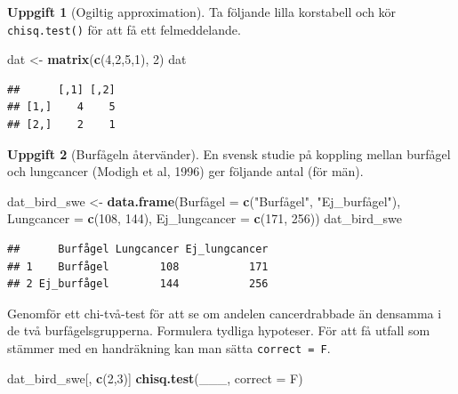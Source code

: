 \documentclass[
]{book}
\newenvironment{Shaded}{\begin{snugshade}}{\end{snugshade}}
\newcommand{\AttributeTok}[1]{\textcolor[rgb]{0.13,0.29,0.53}{#1}}
\newcommand{\DecValTok}[1]{\textcolor[rgb]{0.00,0.00,0.81}{#1}}
\newcommand{\FunctionTok}[1]{\textcolor[rgb]{0.13,0.29,0.53}{\textbf{#1}}}
\newcommand{\NormalTok}[1]{#1}
\newcommand{\OtherTok}[1]{\textcolor[rgb]{0.56,0.35,0.01}{#1}}
\newcommand{\StringTok}[1]{\textcolor[rgb]{0.31,0.60,0.02}{#1}}
\theoremstyle{definition}
\theoremstyle{definition}
\theoremstyle{definition}
\newtheorem{exercise}{Uppgift}[chapter]
\theoremstyle{definition}
\theoremstyle{remark}
\begin{document}
\begin{exercise}[Ogiltig approximation]

Ta följande lilla korstabell och kör \texttt{chisq.test()} för att få ett felmeddelande.

\begin{Shaded}
\begin{Highlighting}[]
\NormalTok{dat }\OtherTok{\textless{}{-}} \FunctionTok{matrix}\NormalTok{(}\FunctionTok{c}\NormalTok{(}\DecValTok{4}\NormalTok{,}\DecValTok{2}\NormalTok{,}\DecValTok{5}\NormalTok{,}\DecValTok{1}\NormalTok{), }\DecValTok{2}\NormalTok{)}
\NormalTok{dat}
\end{Highlighting}
\end{Shaded}

\begin{verbatim}
##      [,1] [,2]
## [1,]    4    5
## [2,]    2    1
\end{verbatim}

\end{exercise}

\begin{exercise}[Burfågeln återvänder]

En svensk studie på koppling mellan burfågel och lungcancer (Modigh et al, 1996) ger följande antal (för män).

\begin{Shaded}
\begin{Highlighting}[]
\NormalTok{dat\_bird\_swe }\OtherTok{\textless{}{-}} \FunctionTok{data.frame}\NormalTok{(Burfågel }\OtherTok{=} \FunctionTok{c}\NormalTok{(}\StringTok{"Burfågel"}\NormalTok{, }\StringTok{"Ej\_burfågel"}\NormalTok{),}
              \AttributeTok{Lungcancer =} \FunctionTok{c}\NormalTok{(}\DecValTok{108}\NormalTok{, }\DecValTok{144}\NormalTok{),}
              \AttributeTok{Ej\_lungcancer =} \FunctionTok{c}\NormalTok{(}\DecValTok{171}\NormalTok{, }\DecValTok{256}\NormalTok{))}
\NormalTok{dat\_bird\_swe}
\end{Highlighting}
\end{Shaded}

\begin{verbatim}
##      Burfågel Lungcancer Ej_lungcancer
## 1    Burfågel        108           171
## 2 Ej_burfågel        144           256
\end{verbatim}

Genomför ett chi-två-test för att se om andelen cancerdrabbade än densamma i de två burfågelsgrupperna. Formulera tydliga hypoteser. För att få utfall som stämmer med en handräkning kan man sätta \texttt{correct\ =\ F}.

\begin{Shaded}
\begin{Highlighting}[]
\NormalTok{dat\_bird\_swe[, }\FunctionTok{c}\NormalTok{(}\DecValTok{2}\NormalTok{,}\DecValTok{3}\NormalTok{)]}
\FunctionTok{chisq.test}\NormalTok{(\_\_\_, }\AttributeTok{correct =}\NormalTok{ F)}
\end{Highlighting}
\end{Shaded}

\end{exercise}
\end{document}
